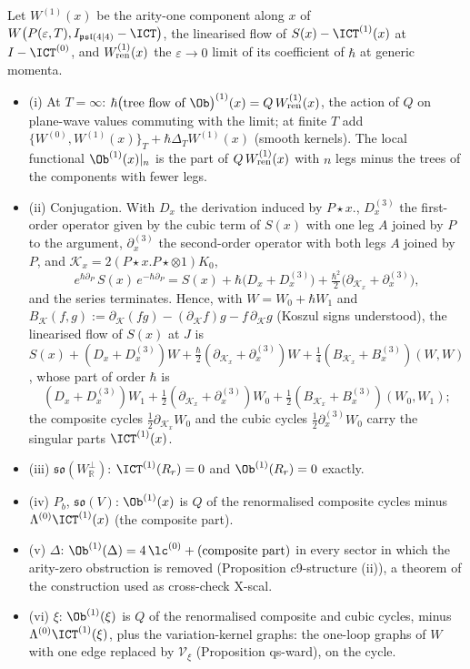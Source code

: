 \begin{theorem}
\label{thm:at-second}
Let $W^{(1)}(x)$ be the arity-one component along $x$ of $W\big(P(\varepsilon,T),I_{\mathfrak{psl}(4|4)}-\ICT\big)$, the linearised flow of $S(x)-\ICT^{(1)}(x)$ at $I-\ICT^{(0)}$, and $W^{(1)}_{\rm ren}(x)$ the $\varepsilon\to0$ limit of its coefficient of $\hbar$ at generic momenta.
\begin{itemize}
\item (i) At $T=\infty$: $\hbar\big(\text{tree flow of }\Ob\big)^{(1)}(x)=Q\,W^{(1)}_{\rm ren}(x)$, the action of $Q$ on plane-wave values commuting with the limit; at finite $T$ add $\{W^{(0)},W^{(1)}(x)\}_T+\hbar\Delta_TW^{(1)}(x)$ (smooth kernels). The local functional $\Ob^{(1)}(x)|_n$ is the part of $Q\,W^{(1)}_{\rm ren}(x)$ with $n$ legs minus the trees of the components with fewer legs.
\item (ii) Conjugation. With $D_x$ the derivation induced by $P\star x.$, $D^{(3)}_x$ the first-order operator given by the cubic term of $S(x)$ with one leg $A$ joined by $P$ to the argument, $\partial^{(3)}_x$ the second-order operator with both legs $A$ joined by $P$, and $\mathcal K_x=2(P\star x.P\star\otimes1)K_0$,
\begin{equation}
e^{\hbar\partial_P}\,S(x)\,e^{-\hbar\partial_P}=S(x)+\hbar\big(D_x+D^{(3)}_x\big)+\tfrac{\hbar^2}2\big(\partial_{\mathcal K_x}+\partial^{(3)}_x\big),
\label{eq:at-conj}
\end{equation}
and the series terminates. Hence, with $W=W_0+\hbar W_1$ and $B_{\mathcal K}(f,g):=\partial_{\mathcal K}(fg)-(\partial_{\mathcal K}f)g-f\,\partial_{\mathcal K}g$ (Koszul signs understood), the linearised flow of $S(x)$ at $J$ is $S(x)+(D_x+D^{(3)}_x)W+\tfrac\hbar2(\partial_{\mathcal K_x}+\partial^{(3)}_x)W+\tfrac14(B_{\mathcal K_x}+B^{(3)}_x)(W,W)$, whose part of order $\hbar$ is
\[
(D_x+D^{(3)}_x)W_1+\tfrac12(\partial_{\mathcal K_x}+\partial^{(3)}_x)W_0+\tfrac12(B_{\mathcal K_x}+B^{(3)}_x)(W_0,W_1);
\]
the composite cycles $\tfrac12\partial_{\mathcal K_x}W_0$ and the cubic cycles $\tfrac12\partial^{(3)}_xW_0$ carry the singular parts $\ICT^{(1)}(x)$.
\item (iii) $\mathfrak{so}(W^\perp_{\mathbb R})$: $\ICT^{(1)}(R_r)=0$ and $\Ob^{(1)}(R_r)=0$ exactly.
\item (iv) $P_b$, $\mathfrak{so}(V)$: $\Ob^{(1)}(x)$ is $Q$ of the renormalised composite cycles minus $\Lambda^{(0)}\ICT^{(1)}(x)$ (the composite part).
\item (v) $\Delta$: $\Ob^{(1)}(\Delta)=4\,\lc^{(0)}+(\text{composite part})$ in every sector in which the arity-zero obstruction is removed (Proposition c9-structure (ii)), a theorem of the construction used as cross-check X-scal.
\item (vi) $\xi$: $\Ob^{(1)}(\xi)$ is $Q$ of the renormalised composite and cubic cycles, minus $\Lambda^{(0)}\ICT^{(1)}(\xi)$, plus the variation-kernel graphs: the one-loop graphs of $W$ with one edge replaced by $\mathcal V_\xi$ (Proposition qs-ward), on the cycle.
\end{itemize}
\end{theorem}

